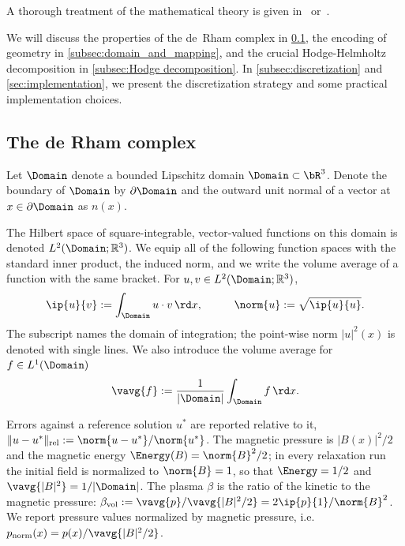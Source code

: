 \documentclass[%
 reprint,
 superscriptaddress,
 amsmath,amssymb,
 aps, nofootinbib, floatfix]{revtex4-2}
\begin{document}
A thorough treatment of the mathematical theory is given in~\citep[Section 2.2]{arnold_finite_2006} or~\citep[Chapter 7.5]{abraham_manifolds_1988}.

We will discuss the properties of the de~Rham complex in \ref{subsec:derhamcomplex}, the encoding of geometry in \ref{subsec:domain_and_mapping}, and the crucial Hodge-Helmholtz decomposition in \ref{subsec:Hodge decomposition}. In \ref{subsec:discretization} and \ref{sec:implementation}, we present the discretization strategy and some practical implementation choices.

\subsection{The de Rham complex}
\label{subsec:derhamcomplex}

Let $\Domain$ denote a bounded Lipschitz domain $\Domain \subset \bR^3$. Denote the boundary of $\Domain$ by $\partial \Domain$ and the outward unit normal of a vector at $x \in \partial \Domain$ as $n(x)$. 

The Hilbert space of square-integrable, vector-valued functions on this domain is denoted $L^2(\Domain; \mathbb{R}^3)$. We equip all of the following function spaces with the standard inner product, the induced norm, and we write the volume average of a function with the same bracket. For $u, v \in L^2(\Domain; \mathbb{R}^3)$,
\begin{align}
\label{eq:inner_product_definition}
    &\ip{u}{v} := \int_\Domain u \cdot v \, \rd x, \qquad
    &\norm{u} := \sqrt{ \ip{u}{u} }.
\end{align}
The subscript names the domain of integration; the point-wise norm $|u|^2(x)$ is denoted with single lines. We also introduce the volume average for $f \in L^1(\Domain)$
\begin{align}
    \vavg{f} := \frac{1}{|\Domain|} \int_\Domain f \, \rd x . 
\end{align} 

Errors against a reference solution $u^*$ are reported relative to it, $\| u - u^* \|_{\mathrm{rel}} := \norm{u - u^*} / \norm{u^*}$. 
%
The magnetic pressure is $|B(x)|^2 / 2$ and the magnetic energy $\Energy(B) = \norm{B}^2 / 2$; in every relaxation run the initial field is normalized to $\norm{B} = 1$, so that $\Energy = 1/2$ and $\vavg{|B|^2} = 1 / |\Domain|$. 
%
The plasma $\beta$ is the ratio of the kinetic to the magnetic pressure: $\beta_{\mathrm{vol}} := \vavg{p} / \vavg{|B|^2 / 2} = 2 \ip{p}{1} / \norm{B}^2$.
%
We report pressure values normalized by magnetic pressure, i.e. $p_{\mathrm{norm}}(x) = p(x) / \vavg{|B|^2 / 2}$.
\end{document}
